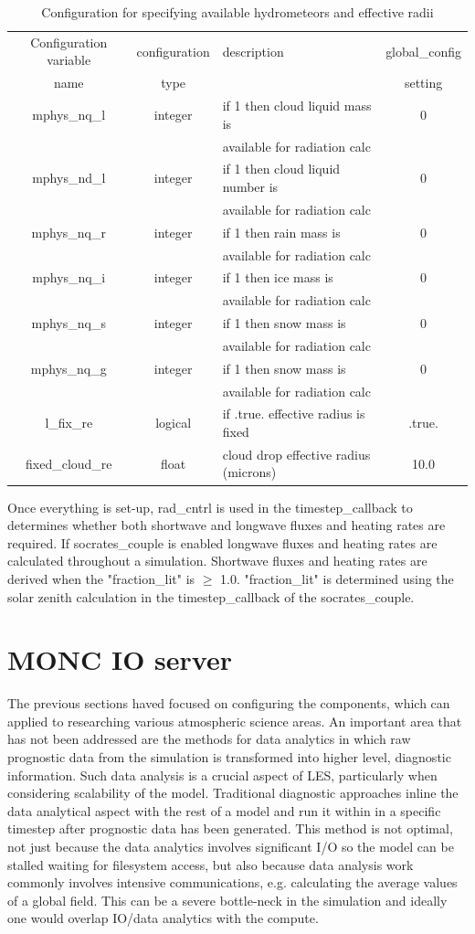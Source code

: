 \documentclass[a4paper,11pt]{article}
\begin{document}
\begin{table}[H]
  \protect\caption{Configuration for specifying available hydrometeors and
  effective radii}
\label{tab:socrates-cloud}
\begin{tabular}{|c|c|l|c|}
\hline
Configuration variable & configuration & description & global\_config \tabularnewline
name & type & & setting \tabularnewline
\hline
\hline
  mphys\_nq\_l & integer & if 1 then cloud liquid mass is & 0 \tabularnewline
   &  & available for radiation calc & \tabularnewline
\hline
  mphys\_nd\_l & integer & if 1 then cloud liquid number is & 0 \tabularnewline
   &  & available for radiation calc & \tabularnewline
\hline
  mphys\_nq\_r & integer & if 1 then rain mass is & 0 \tabularnewline
   &  & available for radiation calc & \tabularnewline
\hline
  mphys\_nq\_i & integer & if 1 then ice mass is & 0 \tabularnewline
   &  & available for radiation calc & \tabularnewline
\hline
  mphys\_nq\_s & integer & if 1 then snow mass is & 0 \tabularnewline
   &  & available for radiation calc & \tabularnewline
\hline
  mphys\_nq\_g & integer & if 1 then snow mass is & 0 \tabularnewline
   &  & available for radiation calc & \tabularnewline
\hline
  l\_fix\_re & logical & if .true. effective radius is fixed & .true. \tabularnewline
\hline
  fixed\_cloud\_re & float & cloud drop effective radius (microns) & 10.0 \tabularnewline
\hline
\hline
\end{tabular}
\end{table}

Once everything is set-up, rad\_cntrl is used in the timestep\_callback to
determines whether both shortwave and longwave fluxes and heating rates are
required. If socrates\_couple is enabled longwave fluxes and heating rates are
calculated throughout a simulation. Shortwave fluxes and heating rates are
derived when the "fraction\_lit" is $\geq$ 1.0. "fraction\_lit" is determined
using the solar zenith calculation in the timestep\_callback of the socrates\_couple.

\section{MONC IO server}

The previous sections haved focused on configuring the components,
which can applied to researching various atmospheric science areas. An important
area that has not been addressed are the methods for data analytics in which
raw prognostic data from the simulation is transformed into higher level, diagnostic
information. Such data analysis is a crucial aspect of LES, particularly when
considering scalability of the model. Traditional diagnostic approaches
inline the data analytical aspect with the rest of a model and run it within
in a specific timestep after prognostic data has been generated. This method is
not optimal, not just because the data analytics involves significant I/O so the
model can be stalled waiting for filesystem access, but also because data analysis work
commonly involves intensive communications, e.g. calculating the average values
of a global field. This can be a severe bottle-neck in the simulation and
ideally one would overlap IO/data analytics with the compute.
\end{document}
